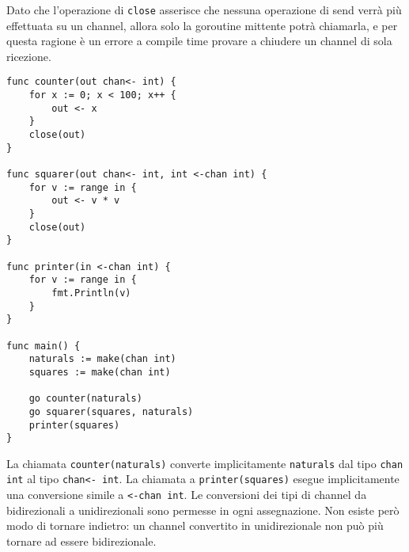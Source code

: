 \documentclass[../../../thesis.tex]{subfiles}
\begin{document}
    Dato che l'operazione di \verb"close" asserisce che nessuna operazione di send verrà più effettuata su un channel, allora solo la goroutine mittente potrà chiamarla, e per questa ragione è un errore a compile time provare a chiudere un channel di sola ricezione.
    \begin{lstlisting}[frame = single,label={lst:lstlisting7-4-3.2}]
func counter(out chan<- int) {
    for x := 0; x < 100; x++ {
        out <- x
    }
    close(out)
}

func squarer(out chan<- int, int <-chan int) {
    for v := range in {
        out <- v * v
    }
    close(out)
}

func printer(in <-chan int) {
    for v := range in {
        fmt.Println(v)
    }
}

func main() {
    naturals := make(chan int)
    squares := make(chan int)

    go counter(naturals)
    go squarer(squares, naturals)
    printer(squares)
}
    \end{lstlisting}
    La chiamata \verb"counter(naturals)" converte implicitamente \verb"naturals" dal tipo \verb"chan int" al tipo \verb"chan<- int".
    La chiamata a \verb"printer(squares)" esegue implicitamente una conversione simile a \verb"<-chan int".
    Le conversioni dei tipi di channel da bidirezionali a unidirezionali sono permesse in ogni assegnazione.
    Non esiste però modo di tornare indietro: un channel convertito in unidirezionale non può più tornare ad essere bidirezionale.
\end{document}
